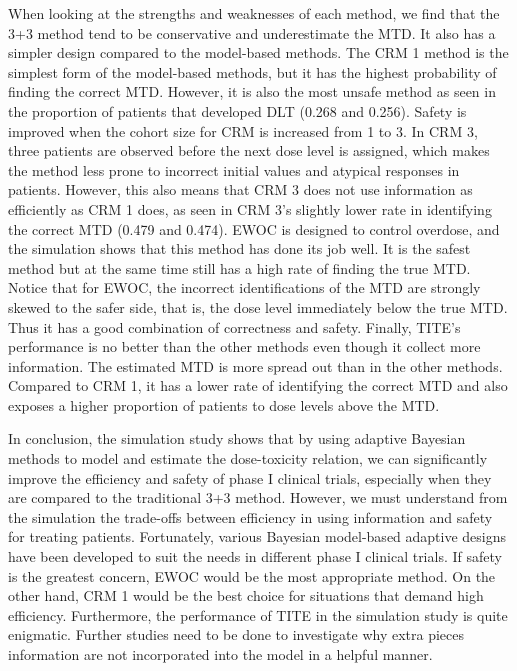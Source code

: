 \documentclass[12pt]{article}
\begin{document}
When looking at the strengths and weaknesses of each method, we find that the 3+3 method tend to be conservative and underestimate the MTD.
It also has a simpler design compared to the model-based methods.
The CRM 1 method is the simplest form of the model-based methods,
but it has the highest probability of finding the correct MTD.
However, it is also the most unsafe method as seen in the proportion of patients that developed DLT (0.268 and 0.256).
Safety is improved when the cohort size for CRM is increased from 1 to 3.
In CRM 3, three patients are observed before the next dose level is assigned,
which makes the method less prone to incorrect initial values and atypical responses in patients.
However, this also means that CRM 3 does not use information as efficiently as CRM 1 does,
as seen in CRM 3's slightly lower rate in identifying the correct MTD (0.479 and 0.474).
EWOC is designed to control overdose, and the simulation shows that this method has done its job well.
It is the safest method but at the same time still has a high rate of finding the true MTD.
Notice that for EWOC, the incorrect identifications of the MTD are strongly skewed to the safer side, that is, the dose level immediately below the true MTD.
Thus it has a good combination of correctness and safety.
Finally, TITE's performance is no better than the other methods even though it collect more information.
The estimated MTD is more spread out than in the other methods.
Compared to CRM 1, it has a lower rate of identifying the correct MTD and also exposes a higher proportion of  patients to dose levels above the MTD.

In conclusion, the simulation study shows that by using adaptive Bayesian methods to model and estimate the dose-toxicity relation,
we can significantly improve the efficiency and safety of phase I clinical trials, especially when they are compared to the traditional 3+3 method.
However, we must understand from the simulation the trade-offs between efficiency in using information and safety for treating patients.
Fortunately, various Bayesian model-based adaptive designs have been developed to suit the needs in different phase I clinical trials.
If safety is the greatest concern, EWOC would be the most appropriate method.
On the other hand, CRM 1 would be the best choice for situations that demand high efficiency.
Furthermore, the performance of TITE in the simulation study is quite enigmatic.
Further studies need to be done to investigate why extra pieces information are not incorporated into the model in a helpful manner.
\end{document}
